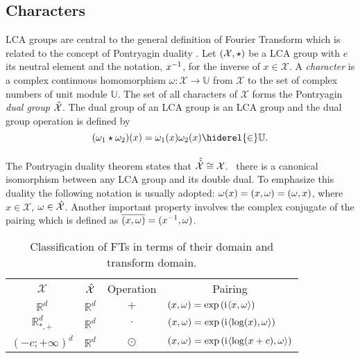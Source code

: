 \subsection{Characters}
\acf{LCA} groups are central to the general definition of Fourier Transform which is related to the concept of Pontryagin duality \citep{folland1994course}.
Let $(\mathcal{X}, \star)$ be a \acs{LCA} group with $e$ its neutral element and the notation, ${x}^{-1}$, for the inverse of $x \in \mathcal{X}$. A \emph{character} is a complex continuous homomorphism $\omega:\mathcal{X}\to\mathbb{U}$ from $\mathcal{X}$ to the set of complex numbers of unit module $\mathbb{U}$. The set of all characters of $\mathcal{X}$ forms the Pontryagin \emph{dual  group} $\hat{\mathcal{X}}$. The dual group of an \acs{LCA} group is an \acs{LCA} group and the dual group operation is defined by 
\begin{dmath*}
(\omega_1 \groupop \omega_2)(x)=\omega_1(x)\omega_2(x) \hiderel{\in} \mathbb{U}.
\end{dmath*}
\paragraph{}
The Pontryagin duality theorem states that $\hat{\hat{\mathcal{X}}}\cong \mathcal{X}$. \Ie~there is a canonical isomorphism between any \acs{LCA} group and its double dual. To emphasize this duality the following notation is usually adopted: $\omega(x)=(x,\omega)=(\omega,x)$, where $x\in\mathcal{X}$, $\omega\in\hat{\mathcal{X}}$. Another important property involves the complex conjugate of the pairing which is defined as $\overline{(x,\omega)} = ({x}^{-1},\omega)$.
\begin{table}[!ht]\label{table:pairings}
\caption{Classification of \acl{FT}s in terms of their domain and transform domain.}
\label{tab:dual_and_pairing}
\centering
\begin{tabularx}{\textwidth}{cccX}
\toprule
\multicolumn{1}{c}{$\mathcal{X}$} & \multicolumn{1}{c}{$\hat{\mathcal{X}}$} & \multicolumn{1}{c}{Operation} & \multicolumn{1}{c}{Pairing} \\
\cmidrule{1-4}
$\mathbb{R}^d$ & $\mathbb{R}^d$ & $+$ & $(x,\omega) = \exp\left({\mathrm{i}\mkern1mu} \langle x, \omega\rangle\right)$ \\
$\mathbb{R}^d_{*,+}$ & $\mathbb{R}^d$ & $\cdot$ & $(x,\omega) =\exp\left( {\mathrm{i}\mkern1mu} \langle\log(x), \omega\rangle \right)$ \\
$(-c;+\infty)^d$ & $\mathbb{R}^d$ & $\odot$ & $(x,\omega) =\exp\left( {\mathrm{i}\mkern1mu} \langle\log(x+c), \omega\rangle \right)$ \\
\bottomrule
\end{tabularx}
\end{table}
